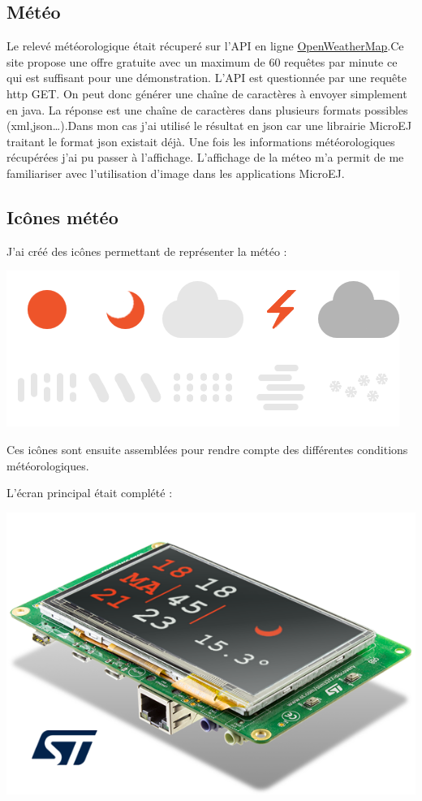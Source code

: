 \documentclass[french,a4paper,12pt]{report}
\begin{document}
\subsection{Météo}

Le relevé météorologique était récuperé sur l’API en ligne \href{https://openweathermap.org/}{OpenWeatherMap}.Ce site propose une offre gratuite avec un maximum de 60 requêtes par minute ce qui est suffisant pour une démonstration. L’API est questionnée par une requête http GET. On peut donc générer une chaîne de caractères à envoyer simplement en java. La réponse est une chaîne de caractères dans plusieurs formats possibles (xml,json…).Dans mon cas j’ai utilisé le résultat en json car une librairie MicroEJ traitant le format json existait déjà. 
Une fois les informations météorologiques récupérées j’ai pu passer à l’affichage. L’affichage de la méteo m’a permit de me familiariser avec l’utilisation d’image dans les applications MicroEJ. 

\subsection{Icônes météo}

J'ai créé des icônes permettant de représenter la météo :

\begin{center}
\includegraphics[width=.5\textwidth]{./ressources/images/weathertogether.png}
\end{center}

Ces icônes sont ensuite assemblées pour rendre compte des différentes conditions météorologiques.

L'écran principal était complété :

\begin{center}
\includegraphics[width=.5\textwidth]{./ressources/schemas/inSituation.png}
\end{center}
\end{document}
